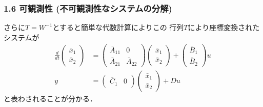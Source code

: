 \begin{frame}[t]
\frametitle{1.6 可観測性 (不可観測性なシステムの分解)}
さらに$T=W^{-1}$とすると簡単な代数計算によりこの
行列$T$により座標変換されたシステムが
\begin{align}
 \frac{d}{dt}
  \left(\begin{array}{c}
         \bar{x}_1 \\
   \bar{x}_2
  \end{array}\right)
  &=
  \left(\begin{array}{cc}
         \bar{A}_{11} & 0 \\
   \bar{A}_{21} & \bar{A}_{22}
  \end{array}\right)
  \left(\begin{array}{c}
         \bar{x}_1 \\
   \bar{x}_2
  \end{array}\right)
  +
  \left(\begin{array}{c}
         \bar{B}_1 \\
   \bar{B}_2
  \end{array}\right)
  u \\
 y &=
  \left(\begin{array}{cc}
         \bar{C}_1 & 0
  \end{array}\right)
  \left(\begin{array}{c}
         \bar{x}_1 \\
   \bar{x}_2
  \end{array}\right)
  + D u
\end{align}
と表わされることが分かる．
\end{frame}


